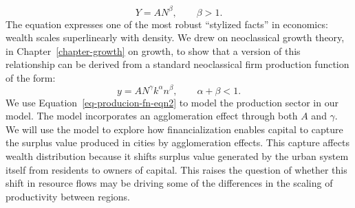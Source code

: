 \begin{equation}\label{eq-agglom-eqn2}
    Y=AN^\beta,\qquad \beta>1. 
\end{equation}
The equation expresses one of the most robust ``stylized facts'' in economics: wealth scales superlinearly with density.  We drew on neoclassical growth theory, in Chapter~\ref{chapter-growth} on growth, to show that a version of this relationship can be derived from a standard neoclassical firm production function of the form: 
\begin{equation}\label{eq-producion-fn-eqn2}
    y=AN^\gamma k^\alpha n^\beta,\qquad \alpha+\beta<1. 
\end{equation}
We use Equation~\ref{eq-producion-fn-eqn2} to model the production sector in our model. The model incorporates an agglomeration effect through both $A$ and $\gamma$. We will use the model to explore how financialization enables capital to capture the surplus value produced in cities by agglomeration effects. This capture affects wealth distribution because it shifts surplus value generated by the urban system itself from residents to owners of capital. %
This raises the question of whether this shift in resource flows may be driving some of the differences in the scaling of productivity between regions.


